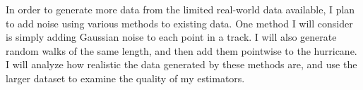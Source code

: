 
\par
In order to generate more data from the limited real-world data available, I plan to add noise using various methods to existing data.
One method I will consider is simply adding Gaussian noise to each point in a track.
I will also generate random walks of the same length, and then add them pointwise to the hurricane.
I will analyze how realistic the data generated by these methods are, and use the larger dataset to examine the quality of my estimators.